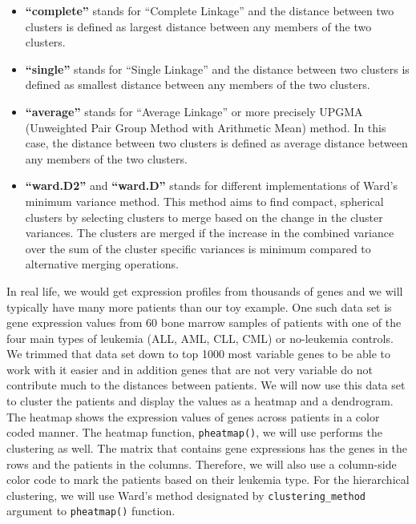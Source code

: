 \documentclass[12pt,]{krantz}
\providecommand{\tightlist}{%
  \setlength{\itemsep}{0pt}\setlength{\parskip}{0pt}}
\begin{document}
\begin{itemize}
\tightlist
\item
  \textbf{``complete''} stands for ``Complete Linkage'' and the distance between two clusters is defined as largest distance between any members of the two clusters.
\item
  \textbf{``single''} stands for ``Single Linkage'' and the distance between two clusters is defined as smallest distance between any members of the two clusters.
\item
  \textbf{``average''} stands for ``Average Linkage'' or more precisely UPGMA (Unweighted Pair Group Method with Arithmetic Mean) method. In this case, the distance between two clusters is defined as average distance between any members of the two clusters.
\item
  \textbf{``ward.D2''} and \textbf{``ward.D''} stands for different implementations of Ward's minimum variance method. This method aims to find compact, spherical clusters by selecting clusters to merge based on the change in the cluster variances. The clusters are merged if the increase in the combined variance over the sum of the cluster specific variances is minimum compared to alternative merging operations.
\end{itemize}

In real life, we would get expression profiles from thousands of genes and we will typically have many more patients than our toy example. One such data set is gene expression values from 60 bone marrow samples of patients with one of the four main types of leukemia (ALL, AML, CLL, CML) or no-leukemia controls. We trimmed that data set down to top 1000 most variable genes to be able to work with it easier and in addition genes that are not very variable do not contribute much to the distances between patients. We will now use this data set to cluster the patients and display the values as a heatmap and a dendrogram. The heatmap shows the expression values of genes across patients in a color coded manner. The heatmap function, \texttt{pheatmap()}, we will use performs the clustering as well. The matrix that contains gene expressions has the genes in the rows and the patients in the columns. Therefore, we will also use a column-side color code to mark the patients based on their leukemia type. For the hierarchical clustering, we will use Ward's method designated by \texttt{clustering\_method} argument to \texttt{pheatmap()} function.
\end{document}
